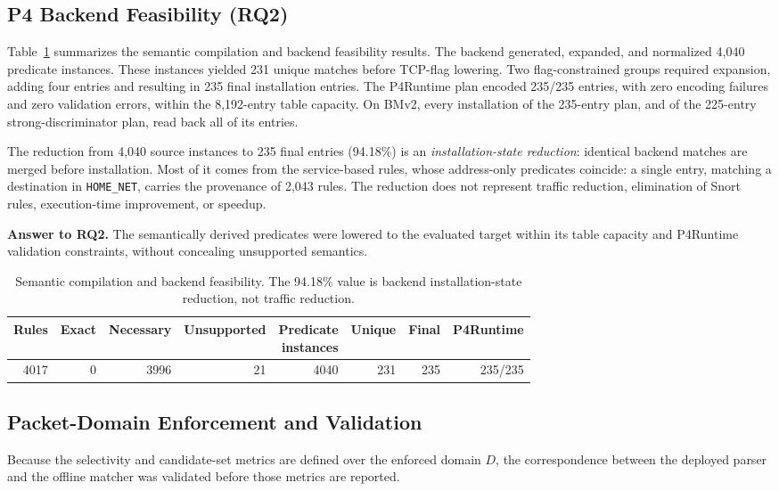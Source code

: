 \documentclass{article}
\begin{document}
\subsection{P4 Backend Feasibility (RQ2)}
Table~\ref{tab:semantic-backend} summarizes the semantic compilation and
backend feasibility results. The backend generated, expanded, and normalized
4,040 predicate instances.
These instances yielded 231 unique matches before TCP-flag lowering. Two
flag-constrained groups required expansion, adding four entries and resulting
in 235 final installation entries. The P4Runtime plan encoded 235/235
entries, with zero encoding failures and zero validation errors, within the
8,192-entry table capacity. On BMv2, every installation of the 235-entry
plan, and of the 225-entry strong-discriminator plan, read back all of its
entries.

The reduction from 4,040 source instances to 235 final entries (94.18\%) is
an \emph{installation-state reduction}: identical backend matches are merged
before installation. Most of it comes from the service-based rules, whose
address-only predicates coincide: a single entry, matching a destination in
\texttt{HOME\_NET}, carries the provenance of 2,043 rules. The reduction does
not represent traffic reduction, elimination of Snort rules, execution-time
improvement, or speedup.

\noindent\textbf{Answer to RQ2.} The semantically derived predicates were
lowered to the evaluated target within its table capacity and P4Runtime
validation constraints, without concealing unsupported semantics.

\begin{table}[h]
\centering
\small
\setlength{\tabcolsep}{4pt}
\caption{Semantic compilation and backend feasibility. The 94.18\% value is
backend installation-state reduction, not traffic reduction.}
\label{tab:semantic-backend}
\begin{tabular}{rrrrrrrr}
\toprule
Rules & Exact & Necessary & Unsupported & \shortstack{Predicate\\instances} & Unique & Final & P4Runtime \\
\midrule
4017 & 0 & 3996 & 21 & 4040 & 231 & 235 & 235/235 \\
\bottomrule
\end{tabular}
\end{table}

\subsection{Packet-Domain Enforcement and Validation}
\label{sec:domain-validation}
Because the selectivity and candidate-set metrics are defined over the
enforced domain $D$, the correspondence between the deployed parser and the
offline matcher was validated before those metrics are reported.
\end{document}

